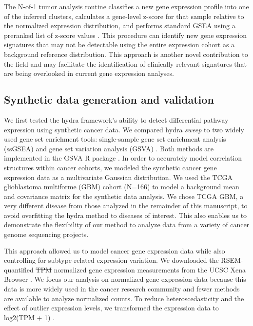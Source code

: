 \documentclass[10pt,letterpaper]{article}
\providecommand{\DIFaddtex}[1]{{\protect\color{blue}\uwave{#1}}} %
\providecommand{\DIFdeltex}[1]{{\protect\color{red}\sout{#1}}}                      %
\providecommand{\DIFaddbegin}{} %
\providecommand{\DIFaddend}{} %
\providecommand{\DIFdelbegin}{} %
\providecommand{\DIFdelend}{} %
\providecommand{\DIFadd}[1]{\texorpdfstring{\DIFaddtex{#1}}{#1}} %
\providecommand{\DIFdel}[1]{\texorpdfstring{\DIFdeltex{#1}}{}} %
\newcommand{\DIFscaledelfig}{0.5}
\newlength{\DIFdelgraphicswidth} %
\newlength{\DIFdelgraphicsheight} %
\newcommand{\DIFaddincludegraphics}[2][]{{\color{blue}\fbox{\DIFOincludegraphics[#1]{#2}}}} %
\newcommand{\DIFdelincludegraphics}[2][]{%
\sbox{\DIFdelgraphicsbox}{\DIFOincludegraphics[#1]{#2}}%
\settoboxwidth{\DIFdelgraphicswidth}{\DIFdelgraphicsbox} %
\settoboxtotalheight{\DIFdelgraphicsheight}{\DIFdelgraphicsbox} %
\scalebox{\DIFscaledelfig}{%
\parbox[b]{\DIFdelgraphicswidth}{\usebox{\DIFdelgraphicsbox}\\[-\baselineskip] \rule{\DIFdelgraphicswidth}{0em}}\llap{\resizebox{\DIFdelgraphicswidth}{\DIFdelgraphicsheight}{%
\setlength{\unitlength}{\DIFdelgraphicswidth}%
\begin{picture}(1,1)%
\thicklines\linethickness{2pt} %
{\color[rgb]{1,0,0}\put(0,0){\framebox(1,1){}}}%
{\color[rgb]{1,0,0}\put(0,0){\line( 1,1){1}}}%
{\color[rgb]{1,0,0}\put(0,1){\line(1,-1){1}}}%
\end{picture}%
}\hspace*{3pt}}} %
} %
\DeclareRobustCommand{\DIFaddbegin}{\DIFOaddbegin \let\includegraphics\DIFaddincludegraphics} %
\DeclareRobustCommand{\DIFaddend}{\DIFOaddend \let\includegraphics\DIFOincludegraphics} %
\DeclareRobustCommand{\DIFdelbegin}{\DIFOdelbegin \let\includegraphics\DIFdelincludegraphics} %
\DeclareRobustCommand{\DIFdelend}{\DIFOaddend \let\includegraphics\DIFOincludegraphics} %
\begin{document}
The N-of-1 tumor analysis routine classifies a new gene expression profile into one of the inferred clusters, calculates a gene-level z-score for that sample relative to the normalized expression distribution, and performs standard GSEA using a preranked list of z-score values \cite{korotkevichFastGeneSet2019}. This procedure can identify new gene expression signatures that may not be detectable using the entire expression cohort as a background reference distribution. This approach is another novel contribution to the field and may facilitate the identification of clinically relevant signatures that are being overlooked in current gene expression analyses.

\subsection*{Synthetic data generation and validation}
We first tested the hydra framework’s ability to detect differential pathway expression using synthetic cancer data. We compared hydra \textit{sweep} to two widely used gene set enrichment tools: single-sample gene set enrichment analysis (ssGSEA) and gene set variation analysis (GSVA) \cite{barbieSystematicRNAInterference2009, hanzelmannGSVAGeneSet2013, tarcaComparisonGeneSet2013}. Both methods are implemented in the GSVA R package \cite{hanzelmannGSVAGeneSet2013}. In order to accurately model correlation structures within cancer cohorts, we modeled the synthetic cancer gene expression data as a multivariate Gaussian distribution. We used the TCGA glioblastoma multiforme (GBM) cohort (N=166) to model a background mean and covariance matrix for the synthetic data analysis. We chose TCGA GBM, a very different disease from those analyzed in the remainder of this manuscript, to avoid overfitting the hydra method to diseases of interest. This also enables us to demonstrate the flexibility of our method to analyze data from a variety of cancer genome sequencing projects.

This approach allowed us to model cancer gene expression data while also controlling for subtype-related expression variation. We downloaded the RSEM-quantified \DIFdelbegin \DIFdel{TPM }\DIFdelend \DIFaddbegin \DIFadd{transcripts per million (TPM) }\DIFaddend normalized gene expression measurements from the UCSC Xena Browser \cite{goldmanUCSCXenaPlatform2018}. We focus our analysis on normalized gene expression data because this data is more widely used in the cancer research community and fewer methods are available to analyze normalized counts. To reduce heteroscedasticity and the effect of outlier expression levels, we transformed the expression data to log2(TPM + 1) \cite{zwienerTransformingRNASeqData2014}.
\end{document}
